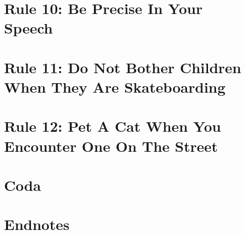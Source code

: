 \documentclass{article}
\numberwithin{equation}{section}
\begin{document}

\section{Rule 10: Be Precise In Your Speech}


\section{Rule 11: Do Not Bother Children When They Are Skateboarding}


\section{Rule 12: Pet A Cat When You Encounter One On The Street}


\section{Coda}


\section{Endnotes}


\printbibliography[heading=bibintoc]
	
\end{document}
